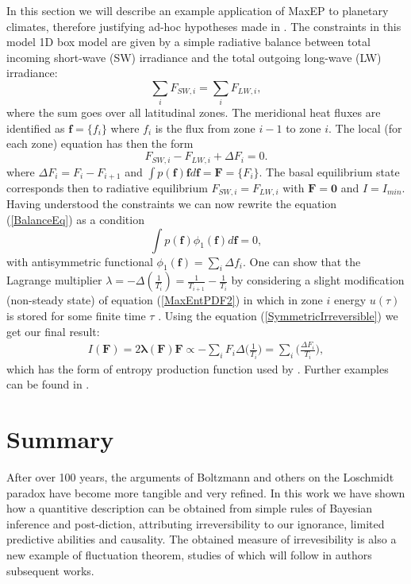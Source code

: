 \documentclass[a4paper,12pt]{article}
\begin{document}
In this section we will describe an example application of MaxEP to planetary climates, therefore justifying ad-hoc hypotheses made in \cite{Paltridge:2007jf}\cite{Lorenz:J80tzZkl}.
The constraints in this model 1D box model are given by a simple radiative balance between total incoming short-wave (SW) irradiance and the total outgoing long-wave (LW) irradiance:
\begin{equation}
\label{BalanceEq}
  \sum_i F_{SW,i}= \sum_i F_{LW,i},
\end{equation}
where the sum goes over all latitudinal zones. The meridional heat fluxes are identified as $\bm{f}=\{f_i\}$ where $f_i$ is the flux from zone $i-1$ to zone $i$. 
The local (for each zone) equation has then the form
\begin{equation}
  F_{SW,i}- F_{LW,i} + \Delta F_i = 0.
\end{equation}
where $\Delta F_i = F_i - F_{i+1}$ and $\int p(\bm{f})\bm{f} d\bm{f}=\bm{F}=\{F_i\}$. 
The basal equilibrium state corresponds then to radiative equilibrium $F_{SW,i}= F_{LW,i}$ with $\bm{F}=\bm{0}$ and $I=I_{min}$. Having understood the constraints we can now rewrite the equation (\ref{BalanceEq}) as a condition
\begin{equation}
  \int p(\bm{f})\phi_1(\bm{f})d\bm{f} =0,
\end{equation}
with antisymmetric functional $\phi_1(\bm{f})=\sum_i \Delta f_i$. 
One can show that the Lagrange multiplier $\lambda = - \Delta (\frac{1}{T_i}) = \frac{1}{T_{i+1}}-\frac{1}{T_i}$ by considering a slight modification (non-steady state) of equation (\ref{MaxEntPDF2}) in which in zone $i$ energy $u(\tau)$ is stored for some finite time $\tau$ \cite{Dewar:2014ek}. 
Using the equation (\ref{SymmetricIrreversible}) we get our final result:
\begin{equation}
\begin{aligned}
  I(\bm{F})=2 \bm{\lambda}(\bm{F})\bm{F} \propto - \sum_i F_i \Delta\bigg(\frac{1}{T_i}\bigg)= \sum_i \bigg(\frac{\Delta F_i}{T_i}\bigg),
\end{aligned}
\end{equation}
which has the form of entropy production function used by \cite{Paltridge:2007jf, Lorenz:J80tzZkl}.
Further examples can be found in \cite{Dewar:2014ek}.
\section{Summary}

After over 100 years, the arguments of Boltzmann and others on the Loschmidt paradox have become more tangible and very refined. In this work we have shown how a quantitive description can be obtained from simple rules of Bayesian inference and post-diction, attributing irreversibility to our ignorance, limited predictive abilities and causality.
The obtained measure of irrevesibility is also a new example of fluctuation theorem, studies of which will follow in authors subsequent works.
\end{document}
